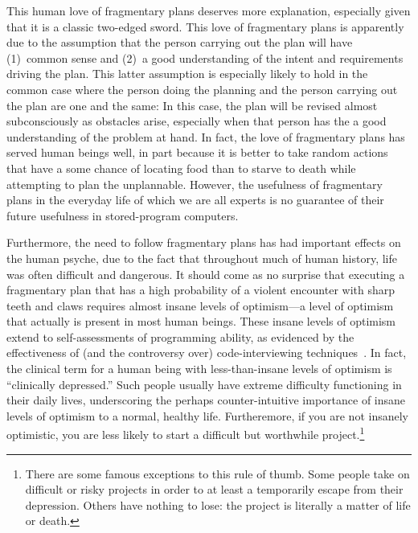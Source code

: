 This human love of fragmentary plans deserves more explanation,
especially given that it is a classic two-edged sword.
This love of fragmentary plans is apparently due to the assumption that
the person carrying out the plan will have (1)~common sense and (2)~a good
understanding of the intent and requirements driving the plan.
This latter assumption is especially likely to hold in the common case
where the person doing the planning and the person carrying out the plan
are one and the same:  In this case, the plan will be revised almost
subconsciously as obstacles arise, especially when that person has the
a good understanding of the problem at hand.
In fact, the love of fragmentary plans has served human beings well,
in part because it is better to take random actions that have a some
chance of locating food than to starve to death while attempting to plan
the unplannable.
However, the usefulness of fragmentary plans in the
everyday life of which we are all experts is no guarantee of their future
usefulness in stored-program computers.

Furthermore, the need to follow fragmentary plans has had important effects
on the human psyche, due to the fact
that throughout much of human history, life was often difficult and dangerous.
It should come as no surprise that executing a fragmentary plan that has
a high probability of a violent encounter with sharp teeth and claws
requires almost insane levels of optimism---a level of optimism that actually
is present in most human beings.
These insane levels of optimism extend to self-assessments of programming
ability, as evidenced by the effectiveness of (and the controversy over)
code-interviewing techniques~\cite{RegBraithwaite2007FizzBuzz}.
In fact, the clinical term for a human being with less-than-insane
levels of optimism is ``clinically depressed.'' Such people usually have
extreme difficulty functioning in their daily lives, underscoring the
perhaps counter-intuitive importance of insane levels of optimism to a
normal, healthy life.
Furtheremore, if you are not insanely optimistic, you are less likely
to start a difficult but worthwhile project.\footnote{
	There are some famous exceptions to this rule of thumb.
	Some people take on difficult or risky projects in order to at
	least a temporarily escape from their depression.
	Others have nothing to lose: the project is literally a matter
	of life or death.}

\QuickQuizEnd

